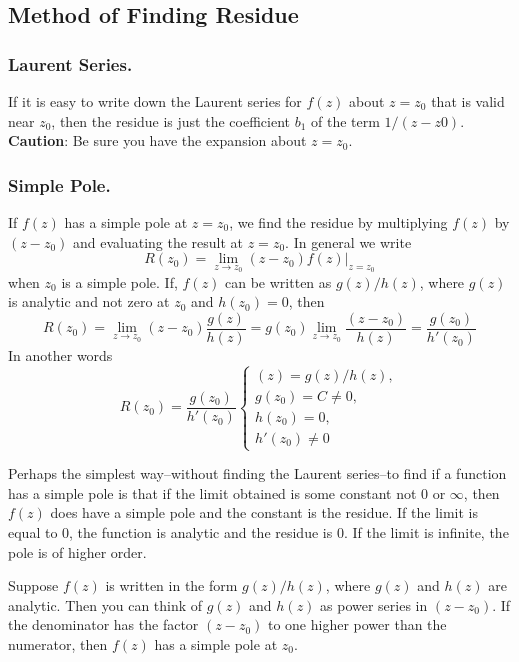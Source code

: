 \documentclass[../main.tex]{subfiles}
\begin{document}
\subsection*{Method of Finding Residue}
\subsubsection*{Laurent Series.} If it is easy to write down the Laurent series for $f (z)$ about $z = z_0$ that is valid near $z_0$, then the residue is just the coefficient $b_1$ of the term $1/(z - z0)$. \textbf{Caution}: Be sure you have the expansion about $z = z_0$.

\subsubsection*{Simple Pole.} If $f (z)$ has a simple pole at $z = z_0$, we find the residue by multiplying $f (z)$ by $(z - z_0)$ and evaluating the result at $z = z_0$. In general we write
\begin{equation*}
    R(z_0) = \lim_{z\rightarrow z_0} (z - z_0)f (z)\bigg|_{z=z_0}
\end{equation*}
when $z_0$ is a simple pole. If, $f (z)$ can be written as $g(z)/h(z)$, where $g(z)$ is analytic and not zero at $z_0$ and $h(z_0) = 0$, then 
\begin{equation*}
    R(z_0) = \lim_{z\rightarrow z_0} (z - z_0)\frac{g(z)}{h(z)}
    =g(z_0)\lim_{z\rightarrow z_0}\frac{ (z - z_0)}{h(z)}
    =\frac{g(z_0)}{h'(z_0)}
\end{equation*}
In another words
\begin{equation*}
    R(z_0)=\frac{g(z_0)}{h'(z_0)}\begin{cases}
        (z) = g(z)/h(z), \\
        g(z_0) =C\neq 0,\\
        h(z_0) = 0,\\
        h'(z_0) \neq  0
    \end{cases}
\end{equation*}

Perhaps the simplest way--without finding the Laurent series--to find if a function has a simple pole is that if the limit obtained is some constant not $0$ or $\infty$, then $f (z)$ does have a simple pole and the constant is the residue. If the limit is equal to 0, the function is analytic and the residue is 0. If the limit is infinite, the pole is of higher order.

Suppose $f (z)$ is written in the form $g(z)/h(z)$, where $g(z)$ and $h(z)$ are analytic. Then you can think of $g(z)$ and $h(z)$ as power series in $(z - z_0)$. If the denominator has the factor $(z - z_0)$ to one higher power than the numerator, then $f (z)$ has a simple pole at $z_0$. 
\end{document}

